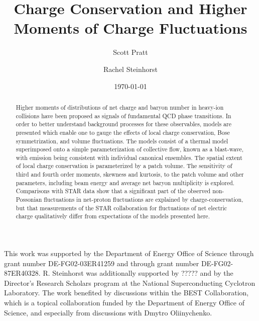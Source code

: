 \documentclass[aps,prc,nofootinbib,showpacs,superscriptaddress,groupedaddress]{revtex4-1}
\begin{document}
\title{Charge Conservation and Higher Moments of Charge Fluctuations}
\author{Scott Pratt}
\author{Rachel Steinhorst}
\date{\today}

\pacs{}

\begin{abstract}
Higher moments of distributions of net charge and baryon number in heavy-ion collisions have been proposed as signals of fundamental QCD phase transitions. In order to better understand background processes for these observables, models are presented which enable one to gauge the effects of local charge conservation, Bose symmetrization, and volume fluctuations. The models consist of a thermal model superimposed onto a simple parameterization of collective flow, known as a blast-wave, with emission being consistent with individual canonical ensembles. The spatial extent of local charge conservation is parameterized by a patch volume. The sensitivity of third and fourth order moments, skewness and kurtosis, to the patch volume and other parameters, including beam energy and average net baryon multiplicity is explored. Comparisons with STAR data show that a significant part of the observed non-Possonian fluctuations in net-proton fluctuations are explained by charge-conservation, but that measurements of the STAR collaboration for fluctuations of net electric charge qualitatively differ from expectations of the models presented here.
\end{abstract}

\maketitle

















\begin{acknowledgments}
This work was supported by the Department of Energy Office of Science through grant number DE-FG02-03ER41259 and through grant number DE-FG02-87ER40328. R. Steinhorst was additionally supported by ????? and by the Director's Research Scholars program at the National Superconducting Cyclotron Laboratory. The work benefited by discussions within the BEST Collaboration, which is a topical collaboration funded by the Department of Energy Office of Science, and especially from discussions with Dmytro Oliinychenko.
\end{acknowledgments}


\end{document}
